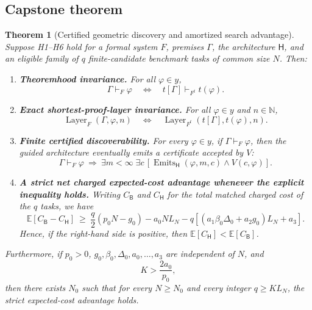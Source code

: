 \documentclass[11pt,letterpaper]{article}
\newtheorem{theorem}{Theorem}[section]
\theoremstyle{definition}
\theoremstyle{remark}
\newcommand{\Layer}{\operatorname{Layer}}
\newcommand{\Emits}{\operatorname{Emits}}
\newcommand{\E}{\mathbb{E}}
\newcommand{\N}{\mathbb{N}}
\newcommand{\Hsys}{\mathsf H}
\newcommand{\Bsys}{\mathsf B}
\begin{document}
\subsection{Capstone theorem}
\begin{theorem}[Certified geometric discovery and amortized search advantage]\label{thm:capstone}
Suppose H1--H6 hold for a formal system $F$, premises $\Gamma$, the architecture $\Hsys$, and an eligible family of $q$ finite-candidate benchmark tasks of common size $N$. Then:
\begin{enumerate}[leftmargin=2.1em,label=\textbf{T\arabic*.},itemsep=0.5em]
 \item \textbf{Theoremhood invariance.} For all $\varphi\in y$,
 \[\Gamma\vdash_F\varphi\quad\Longleftrightarrow\quad t[\Gamma]\vdash_{F^t}t(\varphi).\]
 \item \textbf{Exact shortest-proof-layer invariance.} For all $\varphi\in y$ and $n\in\N$,
 \[\Layer_F(\Gamma,\varphi,n)\quad\Longleftrightarrow\quad \Layer_{F^t}(t[\Gamma],t(\varphi),n).\]
 \item \textbf{Finite certified discoverability.} For every $\varphi\in y$, if $\Gamma\vdash_F\varphi$, then the guided architecture eventually emits a certificate accepted by $V$:
 \[\Gamma\vdash_F\varphi\ \Longrightarrow\ \exists m<\infty\;\exists c\,[\Emits_{\Hsys}(\varphi,m,c)\land V(c,\varphi)].\]
 \item \textbf{A strict net charged expected-cost advantage whenever the explicit inequality holds.} Writing $C_{\Bsys}$ and $C_{\Hsys}$ for the \emph{total} matched charged cost of the $q$ tasks, we have
 \begin{equation}\label{eq:main}
 \boxed{\E[C_{\Bsys}-C_{\Hsys}]\ \ge\ \frac q2(p_0N-g_0)-a_0NL_N-q[(a_1\beta_0\Delta_0+a_2g_0)L_N+a_3].}
 \end{equation}
 Hence, if the right-hand side is positive, then $\E[C_{\Hsys}]<\E[C_{\Bsys}]$.
\end{enumerate}
Furthermore, if $p_0>0$, $g_0,\beta_0,\Delta_0,a_0,\ldots,a_3$ are independent of $N$, and
\begin{equation}\label{eq:K}
 K>\frac{2a_0}{p_0},
\end{equation}
then there exists $N_0$ such that for every $N\ge N_0$ and every integer $q\ge K L_N$, the strict expected-cost advantage holds.
\end{theorem}
\end{document}
